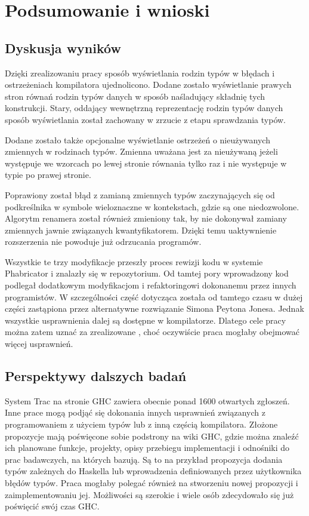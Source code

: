 \chapter{Podsumowanie i wnioski}\label{chap:podsumowanie}

\section{Dyskusja wyników}

Dzięki zrealizowaniu pracy sposób wyświetlania rodzin typów w błędach i
ostrzeżeniach kompilatora ujednolicono. Dodane zostało wyświetlanie prawych
stron równań rodzin typów danych w sposób naśladujący składnię tych
konstrukcji. Stary, oddający wewnętrzną reprezentację rodzin typów danych sposób
wyświetlania został zachowany w zrzucie z etapu sprawdzania typów.

Dodane zostało także opcjonalne wyświetlanie ostrzeżeń o nieużywanych zmiennych
w rodzinach typów. Zmienna uważana jest za nieużywaną jeżeli występuje we
wzorcach po lewej stronie równania tylko raz i nie występuje w typie po prawej
stronie.

Poprawiony został błąd z zamianą zmiennych typów zaczynających się od
podkreślnika w symbole wieloznaczne w kontekstach, gdzie są one
niedozwolone. Algorytm renamera został również zmieniony tak, by nie dokonywał
zamiany zmiennych jawnie związanych kwantyfikatorem. Dzięki temu uaktywnienie
rozszerzenia  nie powoduje już odrzucania programów.

Wszystkie te trzy modyfikacje przeszły proces rewizji kodu w systemie
Phabricator i znalazły się w repozytorium. Od tamtej pory wprowadzony kod
podlegał dodatkowym modyfikacjom i refaktoringowi dokonanemu przez innych
programistów. W szczególności część dotycząca  została od
tamtego czasu w dużej części zastąpiona przez alternatywne rozwiązanie Simona
Peytona Jonesa. Jednak wszystkie usprawnienia dalej są dostępne w
kompilatorze. Dlatego cele pracy można  zatem uznać za zrealizowane
, choć oczywiście praca mogłaby obejmować więcej usprawnień.

\section{Perspektywy dalszych badań}
System Trac na stronie GHC zawiera obecnie ponad 1600 otwartych
zgłoszeń\cite{WikiTickets}. Inne prace mogą podjąć się dokonania innych
usprawnień związanych z programowaniem z użyciem typów lub z inną częścią
kompilatora. Złożone propozycje mają poświęcone sobie podstrony na wiki GHC,
gdzie można znaleźć ich planowane funkcje, projekty, opisy przebiegu
implementacji i odnośniki do prac badawczych, na których bazują. Są to na
przykład propozycja dodania typów zależnych do Haskella lub wprowadzenia
definiowanych przez użytkownika błędów typów. Praca mogłaby polegać również na
stworzeniu nowej propozycji i zaimplementowaniu jej. Możliwości są szerokie i
wiele osób zdecydowało się już poświęcić swój czas GHC.


